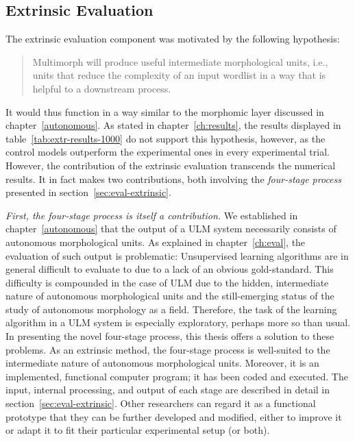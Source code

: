 \subsection{Extrinsic Evaluation}
The extrinsic evaluation component was motivated by the following hypothesis:
\begin{quotation}\noindent
Multimorph will produce useful intermediate morphological units, i.e., units that reduce the
complexity of an input wordlist in a way that is helpful to a downstream process.
\end{quotation}
 It would thus function in a way similar to the morphomic layer discussed in chapter~\ref{autonomous}. As stated in chapter~\ref{ch:results}, the results displayed in table~\ref{tab:extr-results-1000} do not support this hypothesis, however, as the control models outperform the experimental ones in every experimental trial. 
However, the contribution of the extrinsic evaluation transcends the numerical results.
It in fact makes two contributions, both involving the \emph{four-stage process} presented in section~\ref{sec:eval-extrinsic}.

\emph{First, the four-stage process is itself a contribution.}
We established in chapter~\ref{autonomous} that the output of a 
ULM system necessarily consists of autonomous morphological units.
As explained in chapter~\ref{ch:eval}, the evaluation of such output is problematic: Unsupervised learning algorithms are in general difficult to evaluate to due to a lack of an obvious gold-standard. This difficulty is compounded in the case of ULM due to the hidden, intermediate nature of autonomous morphological units and the still-emerging status of the study of autonomous morphology as a field.  Therefore, the task of the learning algorithm in a ULM system is especially exploratory, perhaps more so than usual. %
In presenting the novel four-stage process, this thesis offers a solution 
to these problems. As an extrinsic method, the four-stage process is well-suited to the intermediate nature of autonomous morphological units. 
Moreover, it is an implemented, functional computer program; 
it has been coded and executed. The input, internal 
processing, and output of each stage are described in detail in 
section~\ref{sec:eval-extrinsic}. Other researchers can regard 
it as a functional prototype that they can be further developed and 
modified, either to improve it or adapt it to fit their particular experimental setup (or both).

